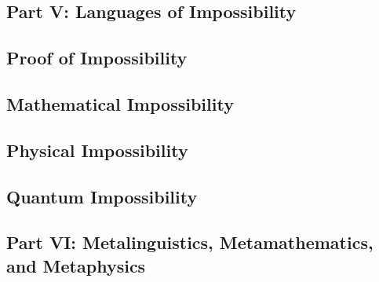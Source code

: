 \hypertarget{part-v-languages-of-impossibility}{%
\subsection*{\texorpdfstring{Part V: Languages of Impossibility
}{Part V: Languages of Impossibility }}\label{part-v-languages-of-impossibility}}

\hypertarget{proof-of-impossibility}{%
\subsection*{\texorpdfstring{Proof of Impossibility
}{Proof of Impossibility }}\label{proof-of-impossibility}}

\hypertarget{mathematical-impossibility}{%
\subsection*{\texorpdfstring{Mathematical Impossibility
}{Mathematical Impossibility }}\label{mathematical-impossibility}}

\hypertarget{physical-impossibility}{%
\subsection*{\texorpdfstring{Physical Impossibility
}{Physical Impossibility }}\label{physical-impossibility}}

\hypertarget{quantum-impossibility}{%
\subsection*{\texorpdfstring{Quantum Impossibility
}{Quantum Impossibility }}\label{quantum-impossibility}}

\hypertarget{part-vi-metalinguistics-metamathematics-and-metaphysics}{%
\subsection*{Part VI: Metalinguistics, Metamathematics, and
Metaphysics}\label{part-vi-metalinguistics-metamathematics-and-metaphysics}}

